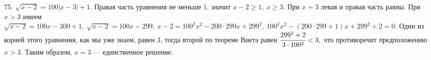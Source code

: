 75. $\sqrt{x-2}=100|x-3|+1.$ Правая часть уравнения не меньше 1, значит  $x-2\geqslant1,\ x\geqslant3.$ При $x=3$ левая и правая часть равны. При $x>3$ имеем
$\sqrt{x-2}=100x-300+1,\ \sqrt{x-2}=100x-299,\ x-2=100^2x^2-200\cdot299x+299^2,\ 100^2x^2-(200\cdot299+1)x+299^2+2=0.$ Один из корней этого уравнения, как мы уже знаем, равен 3, тогда второй по теореме Виета равен $\cfrac{299^2+2}{3\cdot100^2}<3,$ что противоречит предположению $x>3.$ Таким образом, $x=3$ --- единственное решение.\\
